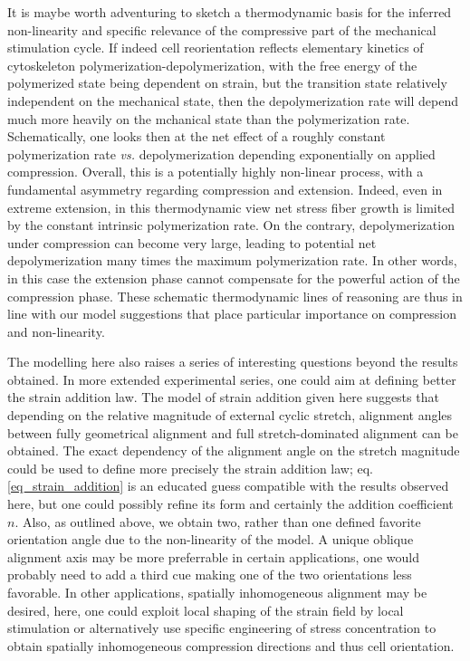 \documentclass[11pt]{amsart}
\begin{document}
It is maybe worth adventuring to sketch a thermodynamic basis for the inferred non-linearity and specific relevance of the compressive part of the mechanical stimulation cycle. If indeed cell reorientation reflects elementary kinetics of cytoskeleton polymerization-depolymerization\cite{vigliotti_thermodynamically_2016}, with the free energy of the polymerized state being dependent on strain, but the transition state relatively independent on the mechanical state\cite{vigliotti_thermodynamically_2016}, then the depolymerization rate will depend much more heavily on the mchanical state than the polymerization rate. Schematically, one looks then at the net effect of a roughly constant polymerization rate \textit{vs.} depolymerization depending exponentially on applied compression\cite{vigliotti_thermodynamically_2016}. Overall, this is a potentially highly non-linear process, with a fundamental asymmetry regarding compression and extension. Indeed, even in extreme extension, in this thermodynamic view net stress fiber growth is limited by the constant intrinsic polymerization rate. On the contrary, depolymerization under compression can become very large, leading to potential net depolymerization many times the maximum polymerization rate. In other words, in this case the extension phase cannot compensate for the powerful action of the compression phase. These schematic thermodynamic lines of reasoning are thus in line with our model suggestions that place particular importance on compression and non-linearity. 

The modelling here also raises a series of interesting questions beyond the results obtained. In more extended experimental series, one could aim at defining better the strain addition law. The model of strain addition given here suggests that depending on the relative magnitude of external cyclic stretch, alignment angles between fully geometrical alignment and full stretch-dominated alignment can be obtained. The exact dependency of the alignment angle on the stretch magnitude could be used to define more precisely the strain addition law; eq. \ref{eq_strain_addition} is an educated guess compatible with the results observed here, but one could possibly refine its form and certainly the addition coefficient $n$. Also, as outlined above, we obtain two, rather than one defined favorite orientation angle due to the non-linearity of the model. A unique oblique alignment axis may be more preferrable in certain applications, one would probably need to add a third cue making one of the two orientations less favorable. In other applications, spatially inhomogeneous alignment may be desired, here, one could exploit local shaping of the strain field by local stimulation or alternatively use specific engineering of stress concentration to obtain spatially inhomogeneous compression directions and thus cell orientation.




 
 
\end{document}
